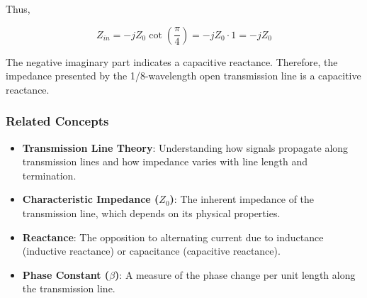 Thus,

\[
Z_{in} = -j Z_0 \cot\left(\frac{\pi}{4}\right) = -j Z_0 \cdot 1 = -j Z_0
\]

The negative imaginary part indicates a capacitive reactance. Therefore, the impedance presented by the 1/8-wavelength open transmission line is a capacitive reactance.

\subsubsection*{Related Concepts}
\begin{itemize}
    \item \textbf{Transmission Line Theory}: Understanding how signals propagate along transmission lines and how impedance varies with line length and termination.
    \item \textbf{Characteristic Impedance (\( Z_0 \))}: The inherent impedance of the transmission line, which depends on its physical properties.
    \item \textbf{Reactance}: The opposition to alternating current due to inductance (inductive reactance) or capacitance (capacitive reactance).
    \item \textbf{Phase Constant (\( \beta \))}: A measure of the phase change per unit length along the transmission line.
\end{itemize}

